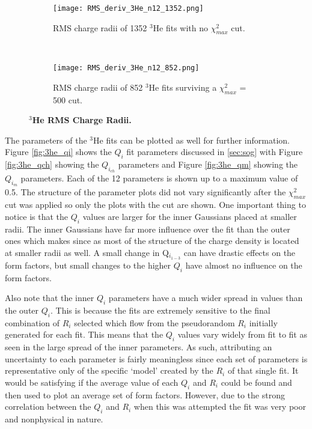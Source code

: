 \begin{figure}[!ht]
\begin{subfigure}{1.\textwidth}
  \centering
  \texttt{[image: RMS\_deriv\_3He\_n12\_1352.png]}
  \caption{RMS charge radii of 1352 $^3$He fits with no $\chi^2_{max}$ cut.}
  \label{fig:3he_rms_deriv_no_cut}
\end{subfigure}\\
\begin{subfigure}{1.\textwidth}
  \centering
  \texttt{[image: RMS\_deriv\_3He\_n12\_852.png]}
  \caption{RMS charge radii of 852 $^3$He fits surviving a $\chi^2_{max}$ = 500 cut.}
  \label{fig:3he_rms_deriv_cut}
\end{subfigure}
\caption[$^3$He RMS Charge Radii]{\bf{$^3$He RMS Charge Radii.}}
\label{fig:3he_rms_deriv}
\end{figure}

The parameters of the $^3$He fits can be plotted as well for further information. Figure \ref{fig:3he_qi} shows the $Q_i$ fit parameters discussed in \ref{sec:sog} with Figure \ref{fig:3he_qch} showing the $Q_{i_{ch}}$ parameters and Figure \ref{fig:3he_qm} showing the $Q_{i_{m}}$ parameters. Each of the 12 parameters is shown up to a maximum value of 0.5. The structure of the parameter plots did not vary significantly after the $\chi^2_{max}$ cut was applied so only the plots with the cut are shown. One important thing to notice is that the $Q_i$ values are larger for the inner Gaussians placed at smaller radii. The inner Gaussians have far more influence over the fit than the outer ones which makes since as most of the structure of the charge density is located at smaller radii as well. A small change in Q$_{i_{1-3}}$ can have drastic effects on the form factors, but small changes to the higher $Q_i$ have almost no influence on the form factors. 

Also note that the inner $Q_i$ parameters have a much wider spread in values than the outer $Q_i$. This is because the fits are extremely sensitive to the final combination of $R_i$ selected which flow from the pseudorandom $R_i$ initially generated for each fit. This means that the $Q_i$ values vary widely from fit to fit as seen in the large spread of the inner parameters. As such, attributing an uncertainty to each parameter is fairly meaningless since each set of parameters is representative only of the specific `model' created by the $R_i$ of that single fit. It would be satisfying if the average value of each $Q_i$ and $R_i$ could be found and then used to plot an average set of form factors. However, due to the strong correlation between the $Q_i$ and $R_i$ when this was attempted the fit was very poor and nonphysical in nature.


